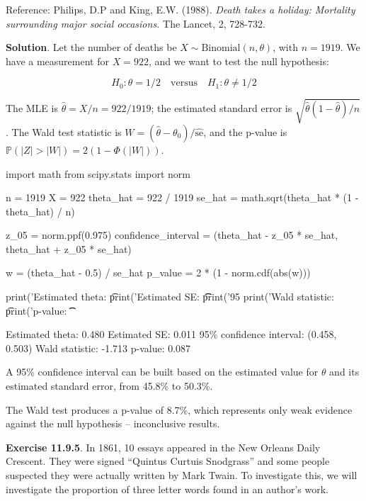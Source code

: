 Reference: Philips, D.P and King, E.W. (1988). \emph{Death takes a
holiday: Mortality surrounding major social occasions.} The Lancet, 2,
728-732.

\textbf{Solution}. Let the number of deaths be
\(X \sim \text{Binomial}(n, \theta)\), with \(n = 1919\). We have a
measurement for \(X = 922\), and we want to test the null hypothesis:

\[H_0:  \theta = 1/2 \quad \text{versus} \quad H_1: \theta \neq 1/2\]

The MLE is \(\hat{\theta} = X / n = 922 / 1919\); the estimated standard
error is \(\sqrt{\hat{\theta}(1 - \hat{\theta})/n}\). The Wald test
statistic is \(W = (\hat{\theta} - \theta_0) / \hat{\text{se}}\), and
the p-value is \(\mathbb{P}(|Z| > |W|) = 2(1 - \Phi(|W|))\).

\begin{python}
import math
from scipy.stats import norm

n = 1919
X = 922
theta_hat = 922 / 1919
se_hat = math.sqrt(theta_hat * (1 - theta_hat) / n)

z_05 = norm.ppf(0.975)
confidence_interval = (theta_hat - z_05 * se_hat, theta_hat + z_05 * se_hat)

w = (theta_hat - 0.5) / se_hat
p_value = 2 * (1 - norm.cdf(abs(w)))

print('Estimated theta: \t %
print('Estimated SE: \t\t %
print('95%
print('Wald statistic: \t %
print('p-value: \t\t %
\end{python}

\begin{console}
Estimated theta:         0.480
Estimated SE:            0.011
95\% confidence interval: (0.458, 0.503)
Wald statistic:          -1.713
p-value:                 0.087
\end{console}

A 95\% confidence interval can be built based on the estimated value for
\(\theta\) and its estimated standard error, from 45.8\% to 50.3\%.

The Wald test produces a p-value of 8.7\%, which represents only weak
evidence against the null hypothesis -- inconclusive results.

\textbf{Exercise 11.9.5}. In 1861, 10 essays appeared in the New Orleans
Daily Crescent. They were signed ``Quintus Curtuis Snodgrass'' and some
people suspected they were actually written by Mark Twain. To
investigate this, we will investigate the proportion of three letter
words found in an author's work.

